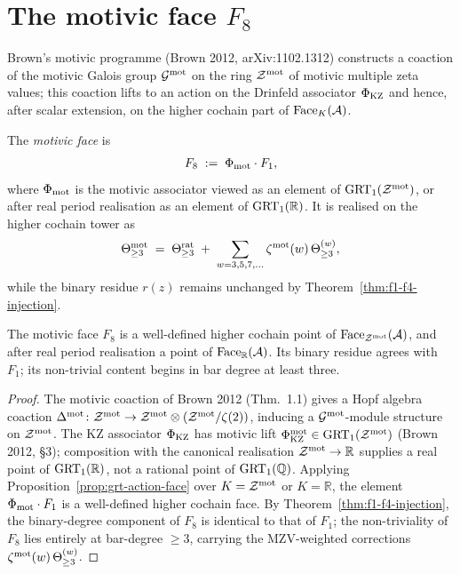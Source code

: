 \section{The motivic face \texorpdfstring{$F_8$}{F8}}
\label{sec:f8-motivic}

Brown's motivic programme (Brown 2012, arXiv:1102.1312) constructs
a coaction of the motivic Galois group $\mathcal{G}^{\mathrm{mot}}$ on the
ring $\mathcal{Z}^{\mathrm{mot}}$ of motivic multiple zeta values; this
coaction lifts to an action on the Drinfeld associator $\Phi_{\mathrm{KZ}}$
and hence, after scalar extension, on the higher cochain part of
$\mathrm{Face}_K(\mathcal{A})$.

\begin{definition}
The \emph{motivic face} is
\[
 F_8 \;:=\; \Phi_{\mathrm{mot}}\cdot F_1,
\]
where $\Phi_{\mathrm{mot}}$ is the motivic associator viewed as an element of
$\mathrm{GRT}_1(\mathcal{Z}^{\mathrm{mot}})$, or after real period realisation as an
element of $\mathrm{GRT}_1(\mathbb{R})$. It is realised on the higher cochain
tower as
\[
 \Theta_{\geq3}^{\mathrm{mot}}
 \;=\;
 \Theta_{\geq3}^{\mathrm{rat}}
 \;+\;
 \sum_{w=3,5,7,\dots}\zeta^{\mathrm{mot}}(w)\,\Theta^{(w)}_{\geq3},
\]
while the binary residue $r(z)$ remains unchanged by
Theorem~\ref{thm:f1-f4-injection}.
\end{definition}

\begin{theorem}
The motivic face $F_8$ is a well-defined higher cochain point of
$\mathrm{Face}_{\mathcal Z^{\mathrm{mot}}}(\mathcal{A})$, and after real period realisation a
point of $\mathrm{Face}_{\mathbb R}(\mathcal{A})$. Its binary residue agrees with
$F_1$; its non-trivial content begins in bar degree at least three.
\end{theorem}

\begin{proof}
The motivic coaction of Brown 2012 (Thm.~1.1) gives a Hopf
algebra coaction
$\Delta^{\mathrm{mot}}\colon\mathcal{Z}^{\mathrm{mot}}\to
\mathcal{Z}^{\mathrm{mot}}\otimes(\mathcal{Z}^{\mathrm{mot}}/\zeta(2))$, inducing
a $\mathcal{G}^{\mathrm{mot}}$-module structure on $\mathcal{Z}^{\mathrm{mot}}$.
The KZ associator $\Phi_{\mathrm{KZ}}$ has motivic lift $\Phi_{\mathrm{KZ}}^{\mathrm{mot}}
\in\mathrm{GRT}_1(\mathcal{Z}^{\mathrm{mot}})$ (Brown 2012, \S3); composition with
the canonical realisation $\mathcal{Z}^{\mathrm{mot}}\to\mathbb{R}$
supplies a real point of $\mathrm{GRT}_1(\mathbb R)$, not a rational point of
$\mathrm{GRT}_1(\mathbb Q)$. Applying
Proposition~\ref{prop:grt-action-face} over
$K=\mathcal{Z}^{\mathrm{mot}}$ or $K=\mathbb R$, the element
$\Phi_{\mathrm{mot}}\cdot F_1$ is a well-defined higher cochain face. By
Theorem~\ref{thm:f1-f4-injection}, the binary-degree component of
$F_8$ is identical to that of $F_1$; the non-triviality of $F_8$ lies
entirely at bar-degree $\geq 3$, carrying the MZV-weighted corrections
$\zeta^{\mathrm{mot}}(w)\,\Theta^{(w)}_{\geq3}$.
\end{proof}

